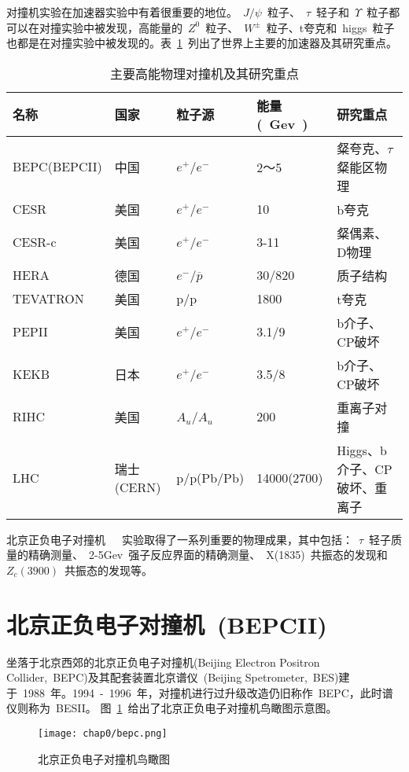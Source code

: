 对撞机实验在加速器实验中有着很重要的地位。~$J/\psi$~粒子、~$\tau$~轻子和~$\Upsilon$~粒子都可以在对撞实验中被发现，高能量的~$Z^{0}$~粒子、~$W^{\pm}$~粒子、t夸克和~higgs~粒子也都是在对撞实验中被发现的。表~\ref{tbl:collider-accelerator}~列出了世界上主要的加速器及其研究重点。

\begin{table}[h]
    \centering
    \caption{\label{tbl:collider-accelerator} 主要高能物理对撞机及其研究重点}
    \footnotesize
    \begin{tabular}{lllll}
        \hline
        名称& 国家& 粒子源& 能量(~Gev~)& 研究重点\\
        \hline
        BEPC(BEPCII)& 中国& $e^{+}$/$e^{-}$& 2～5& 粲夸克、$\tau$粲能区物理 \\
        CESR& 美国& $e^{+}$/$e^{-}$& 10& b夸克 \\
        CESR-c& 美国& $e^{+}$/$e^{-}$& 3-11& 粲偶素、D物理 \\
        HERA& 德国&  $e^{-}$/$\overline{p}$&30/820& 质子结构\\
        TEVATRON& 美国& p/p&1800& t夸克\\
        PEPII& 美国& $e^{+}$/$e^{-}$& 3.1/9& b介子、CP破坏\\
        KEKB& 日本&   $e^{+}$/$e^{-}$& 3.5/8& b介子、CP破坏\\
        RIHC& 美国& $A_{u}$/$A_{u}$& 200& 重离子对撞\\
        LHC& 瑞士(CERN)& p/p(Pb/Pb)& 14000(2700)& Higgs、b介子、CP破坏、重离子\\
        \hline
    \end{tabular}
\end{table}

北京正负电子对撞机~\cite{xiejl1996}~\cite{ihep:2003}~\cite{ihep:2006}实验取得了一系列重要的物理成果，其中包括：~$\tau$~轻子质量的精确测量、~2-5Gev~强子反应界面的精确测量、~X(1835)~共振态的发现和~$Z_{c}(3900)$~\cite{BESIII:2013}共振态的发现等。

\section{北京正负电子对撞机~(BEPCII)~}

坐落于北京西郊的北京正负电子对撞机(Beijing Electron Positron Collider,~BEPC)及其配套装置北京谱仪~\cite{zhengzp2009}(Beijing Spetrometer,~BES)建于~1988~年。1994~-~1996~年，对撞机进行过升级改造仍旧称作~BEPC，此时谱仪则称为~BESII。
图~\ref{fig:bepc}~给出了北京正负电子对撞机鸟瞰图示意图。
\begin{figure}[!h]
  \centering
  \texttt{[image: chap0/bepc.png]}
  \caption{北京正负电子对撞机鸟瞰图}
  \label{fig:bepc}
\end{figure}

